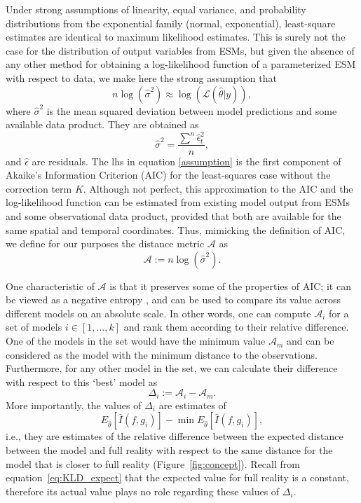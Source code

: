 \documentclass[gmd, manuscript]{copernicus}
\begin{document}
Under strong assumptions of linearity, equal variance, and probability distributions from the exponential family (normal, exponential), least-square estimates are identical to maximum likelihood estimates. This is surely not the case for the distribution of output variables from ESMs, but given the absence of any other method for obtaining a log-likelihood function of a parameterized ESM with respect to data, we make here the strong assumption that
\begin{equation} \label{assumption}
n \log(\hat{\sigma}^2) \approx \log (\mathcal{L}(\hat{\theta} | y) ),
\end{equation}
where $\hat{\sigma}^2$ is the mean squared deviation between model predictions and some available data product. They are obtained as
\begin{equation}
\hat{\sigma}^2 = \frac{\sum^n \hat{\epsilon}_t^2 }{n},
\end{equation}
and $\hat{\epsilon}$ are residuals. The lhs in equation \eqref{assumption} is the first component of Akaike's Information Criterion (AIC) for the least-squares case without the correction term $K$. Although not perfect, this approximation to the AIC and the log-likelihood function can be estimated from existing model output from ESMs and some observational data product, provided that both are available for the same spatial and temporal coordinates. Thus, mimicking the definition of AIC, we define for our purposes the distance metric $\mathcal{A}$ as
\begin{equation} \label{eq:A}
\mathcal{A} := n \log (\hat{\sigma}^2).
\end{equation} 

One characteristic of $\mathcal{A}$ is that it preserves some of the properties of AIC; it can be viewed as a negative entropy \citep{Akaike1985}, and can be used to compare its value across different models on an absolute scale. In other words, one can compute $\mathcal{A}_i$ for a set of models $i \in [1, \dots ,k]$ and rank them according to their relative difference. One of the models in the set would have the minimum value $\mathcal{A}_m$ and can be considered as the model with the minimum distance to the observations. Furthermore, for any other model in the set, we can calculate their difference with respect to this `best' model as
\begin{equation} \label{eq:Deltai}
\Delta_i := \mathcal{A}_i - \mathcal{A}_m.
\end{equation}
More importantly, the values of $\Delta_i$ are estimates of 
\begin{equation}
E_{\hat{\theta}} [\hat{I}(f, g_i)] - \min E_{\hat{\theta}} [\hat{I}(f, g_i)],
\end{equation}
i.e., they are estimates of the relative difference between the expected distance between the model and full reality with respect to the same distance for the model that is closer to full reality (Figure~\ref{fig:concept}). Recall from equation~\ref{eq:KLD_expect} that the expected value for full reality is a constant, therefore its actual value plays no role regarding these values of $\Delta_i$.
\end{document}
